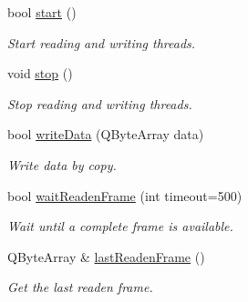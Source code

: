 \begin{DoxyCompactItemize}
bool \hyperlink{classmdt_port_manager_af1fb103ffafc227337a59c7e82f44fbc}{start} ()
\begin{DoxyCompactList}\small\item\em Start reading and writing threads. \end{DoxyCompactList}\item 
void \hyperlink{classmdt_port_manager_aacbf87cc3d9c37c87e21696f8a6514bd}{stop} ()
\begin{DoxyCompactList}\small\item\em Stop reading and writing threads. \end{DoxyCompactList}\item 
bool \hyperlink{classmdt_port_manager_a6d3cc4e522326e2a6ca0da401ae58271}{writeData} (QByteArray data)
\begin{DoxyCompactList}\small\item\em Write data by copy. \end{DoxyCompactList}\item 
bool \hyperlink{classmdt_port_manager_a44ca338c8c56893612301e09d2ee6e88}{waitReadenFrame} (int timeout=500)
\begin{DoxyCompactList}\small\item\em Wait until a complete frame is available. \end{DoxyCompactList}\item 
\hypertarget{classmdt_port_manager_ac289078134036e05eaa3eabc6799443a}{
QByteArray \& \hyperlink{classmdt_port_manager_ac289078134036e05eaa3eabc6799443a}{lastReadenFrame} ()}
\label{classmdt_port_manager_ac289078134036e05eaa3eabc6799443a}

\begin{DoxyCompactList}\small\item\em Get the last readen frame. \end{DoxyCompactList}\end{DoxyCompactItemize}
